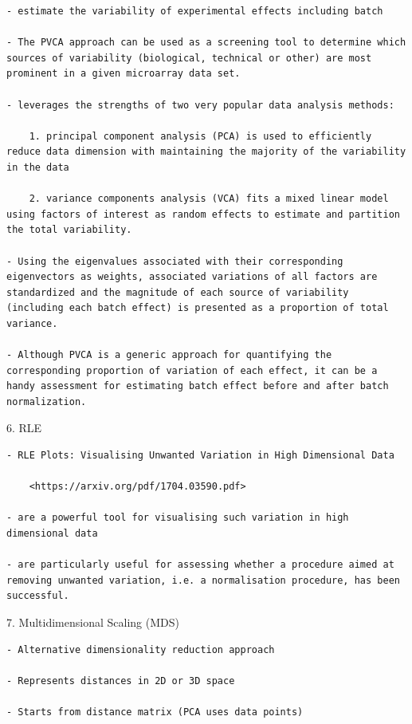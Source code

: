 \documentclass[
]{book}
\begin{document}
\begin{verbatim}
- estimate the variability of experimental effects including batch

- The PVCA approach can be used as a screening tool to determine which sources of variability (biological, technical or other) are most prominent in a given microarray data set.

- leverages the strengths of two very popular data analysis methods:

    1. principal component analysis (PCA) is used to efficiently reduce data dimension with maintaining the majority of the variability in the data

    2. variance components analysis (VCA) fits a mixed linear model using factors of interest as random effects to estimate and partition the total variability.

- Using the eigenvalues associated with their corresponding eigenvectors as weights, associated variations of all factors are standardized and the magnitude of each source of variability (including each batch effect) is presented as a proportion of total variance.

- Although PVCA is a generic approach for quantifying the corresponding proportion of variation of each effect, it can be a handy assessment for estimating batch effect before and after batch normalization.
\end{verbatim}

6. RLE

\begin{verbatim}
- RLE Plots: Visualising Unwanted Variation in High Dimensional Data

    <https://arxiv.org/pdf/1704.03590.pdf>

- are a powerful tool for visualising such variation in high dimensional data

- are particularly useful for assessing whether a procedure aimed at removing unwanted variation, i.e. a normalisation procedure, has been successful.
\end{verbatim}

7. Multidimensional Scaling (MDS)

\begin{verbatim}
- Alternative dimensionality reduction approach

- Represents distances in 2D or 3D space

- Starts from distance matrix (PCA uses data points)
\end{verbatim}
\end{document}
